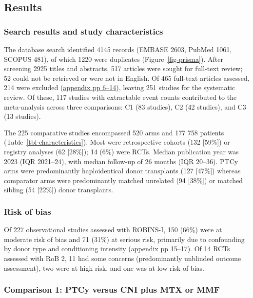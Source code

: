 \documentclass[
  british,
  8.6pt,
  a4paper,
  twocolumn]{article}
\begin{document}
\subsection{Results}\label{results}

\subsubsection{Search results and study
characteristics}\label{search-results-and-study-characteristics}

The database search identified 4145 records (EMBASE 2603, PubMed 1061,
SCOPUS 481), of which 1220 were duplicates (Figure~\ref{fig-prisma}).
After screening 2925 titles and abstracts, 517 articles were sought for
full-text review; 52 could not be retrieved or were not in English. Of
465 full-text articles assessed, 214 were excluded
(\href{appendix-preview.html\#s2.-studies-excluded-at-full-text-screening-n214}{appendix
pp 6--14}), leaving 251 studies for the systematic review. Of these, 117
studies with extractable event counts contributed to the meta-analysis
across three comparisons: C1 (83 studies), C2 (42 studies), and C3 (13
studies).

The 225 comparative studies encompassed 520 arms and 177 758 patients
(Table~\ref{tbl-characteristics}). Most were retrospective cohorts (132
{[}59\%{]}) or registry analyses (62 {[}28\%{]}); 14 (6\%) were RCTs.
Median publication year was 2023 (IQR 2021--24), with median follow-up
of 26 months (IQR 20--36). PTCy arms were predominantly haploidentical
donor transplants (127 {[}47\%{]}) whereas comparator arms were
predominantly matched unrelated (94 {[}38\%{]}) or matched sibling (54
{[}22\%{]}) donor transplants.

\subsubsection{Risk of bias}\label{risk-of-bias}

Of 227 observational studies assessed with ROBINS-I, 150 (66\%) were at
moderate risk of bias and 71 (31\%) at serious risk, primarily due to
confounding by donor type and conditioning intensity
(\href{appendix-preview.html\#s5.-risk-of-bias}{appendix pp 15--17}). Of
14 RCTs assessed with RoB 2, 11 had some concerns (predominantly
unblinded outcome assessment), two were at high risk, and one was at low
risk of bias.

\subsubsection{Comparison 1: PTCy versus CNI plus MTX or
MMF}\label{comparison-1-ptcy-versus-cni-plus-mtx-or-mmf}
\end{document}
